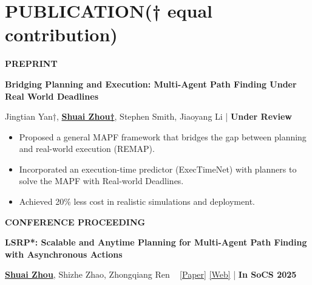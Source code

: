 \documentclass[a4paper,9pt]{extarticle}
\begin{document}
\section*{{\textbf{\fontsize{14pt}{8pt}\selectfont P}\textbf{\scshape UBLICATION}}(† equal contribution)}
{\textbf{\fontsize{12pt}{4pt}\selectfont P}\textbf{\scshape REPRINT}}
\par\vspace{4pt}\noindent
\par\textbf{Bridging Planning and Execution: Multi-Agent Path Finding Under Real World Deadlines}
\par\textup{Jingtian Yan†, \underline{\textbf{Shuai Zhou†}}, Stephen Smith, Jiaoyang Li   \hfill | \textbf{Under Review}}
\begin{itemize} 
    \item Proposed a general MAPF framework that bridges the gap between planning and real-world execution (REMAP). 
    \item Incorporated an execution-time predictor (ExecTimeNet) with planners to solve the MAPF with Real-world Deadlines.
    \item Achieved 20\% less cost in realistic simulations and deployment.
\end{itemize} 
{\textbf{\fontsize{12pt}{4pt}\selectfont C}\textbf{\scshape ONFERENCE PROCEEDING}}
\par\vspace{4pt}\noindent
\par\textbf{LSRP*: Scalable and Anytime Planning for Multi-Agent Path Finding with Asynchronous Actions}
\par\textup{\underline{\textbf{Shuai Zhou}}, Shizhe Zhao, Zhongqiang Ren \ \textbar{} \href{https://doi.org/10.1609/socs.v18i1.36016}{[Paper]} \textbar{} \href{https://rap-lab.github.io/research/mapfaa}{[Web]} \textbar{}  \hfill | \textbf{In SoCS 2025}}   %
\end{document}
